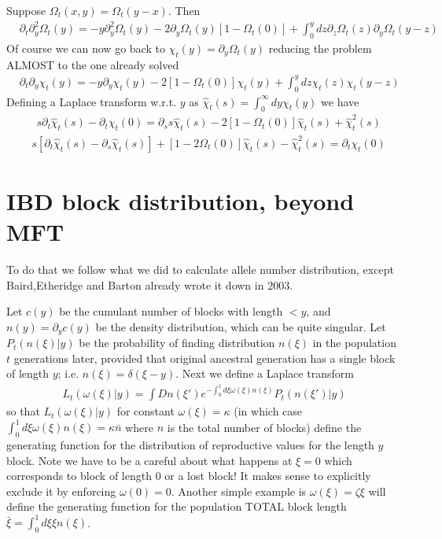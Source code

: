 \documentclass{article}
\begin{document}
Suppose $\Omega_t (x,y)=\Omega_t(y-x)$. Then
\begin{eqnarray}
&\partial_t \partial_y^2 \Omega_{t} (y) =  -y \partial_y^2 \Omega_t (y)  - 2\partial_y \Omega_t (y)[1-\Omega_t (0)]+\int_0^ydz   \partial_z  \Omega_t (z) \partial_y  \Omega_t (y-z)
\end{eqnarray}
Of course we can now go back to $\chi_t(y)=\partial_y \Omega_t(y)$ reducing the problem ALMOST to the one already solved
\begin{eqnarray}
&\partial_t \partial_y \chi_{t} (y) =  -y \partial_y \chi_t (y)  -2[1-\Omega_t (0)] \chi_t (y)+\int_0^ydz   \chi_t (z)  \chi_t (y-z)
\end{eqnarray}
Defining a Laplace transform w.r.t. $y$ as $\hat{\chi}_t(s)=\int_0^{\infty}dy \chi_t(y)$ we have
\begin{eqnarray}
&s\partial_t \hat{ \chi}_{t} (s)-\partial_t { \chi}_{t} (0) =   \partial_s s\hat{\chi}_t (s)  -2[1-\Omega_t (0)] \hat{\chi}_t (s)+\hat{\chi}_t^2 (s)
\end{eqnarray}
\begin{eqnarray}
&s\left [\partial_t \hat{ \chi}_{t} (s)-\partial_s \hat{ \chi}_{t} (s) \right ]+[1-2\Omega_t (0)]\hat{\chi}_t (s)-\hat{\chi}_t^2 (s)=\partial_t { \chi}_{t} (0) 
\end{eqnarray}

\section*{IBD block distribution, beyond MFT}
To do that we follow what we did to calculate allele number distribution, except Baird,Etheridge and Barton already wrote it down in 2003.

Let $c(y)$ be the cumulant number of blocks with length $<y$, and $n (y) = \partial_y c(y)$ be the density distribution, which can be quite singular. Let $P_t (n(\xi ) |y)$ be the probability of finding distribution $n (\xi )$ in the population $t$ generations later, provided that original ancestral generation has a single block of length $y$; i.e. $n(\xi)=\delta (\xi -y)$. Next we define a Laplace transform
\begin{eqnarray}
L_t(\omega (\xi ) | y )=\int D n (\xi ') e^{-\int_0^{1} d\xi \omega (\xi ) n (\xi )}P_t ( n(\xi ' ) |y)
\end{eqnarray}
so that $L_t(\omega (\xi ) | y )$ for constant $\omega (\xi ) = \kappa$  (in which case $\int_0^{1} d\xi \omega (\xi ) n (\xi ) = \kappa \bar{n}$ where $n$ is the total number of blocks) define the generating function for the distribution of reproductive values for the length $y$ block. Note we have to be a careful about what happens at $\xi=0$ which corresponds to block of length $0$ or a lost block! It makes sense to explicitly exclude it by enforcing $\omega (0)=0$. Another simple example is $\omega (\xi ) = \zeta \xi$ will define the generating function for the population TOTAL block length $\bar{\xi} =\int_0^{1} d\xi \xi  n (\xi )$.
\end{document}
